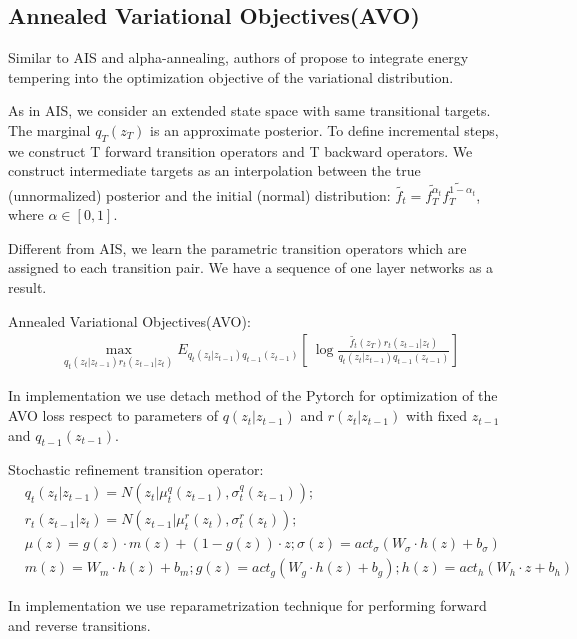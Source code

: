 \documentclass{article}
\begin{document}
\subsection*{Annealed Variational Objectives(AVO)}

Similar to AIS and alpha-annealing, authors of \cite{main_Huang2018ImprovingEI} propose to integrate energy tempering into the optimization objective of the variational distribution. 

As in AIS, we consider an extended state space with same transitional targets.
The marginal $q_T(z_T)$ is an approximate posterior. 
To define incremental steps, we construct T forward transition operators and T backward operators. 
We construct intermediate targets
as an interpolation between the true (unnormalized) posterior and the initial (normal) distribution:
$\tilde{f_t} = \tilde{f_T^{\alpha_t}}\tilde{f_T^{1 - \alpha_t}}$, where $\alpha \in [0, 1]$. 



Different from AIS, we learn the parametric transition operators which are assigned to each transition pair. We have a sequence of one layer networks as a result.

Annealed Variational Objectives(AVO):
\begin{align*}
    \max_{q_t(z_t| z_{t-1})r_{t}(z_{t-1} | z_t)} E_{q_t(z_t| z_{t-1})q_{t-1}(z_{t-1})}[\ 
    \log \frac{\tilde{f_t}(z_T) r_{t}(z_{t-1} | z_t)}{q_t(z_t| z_{t-1})q_{t-1}(z_{t-1})} ]
\end{align*}

In implementation we use detach method of the Pytorch for optimization of the AVO loss respect to parameters of $q(z_t|z_{t -1 })$ and $r(z_t|z_{t - 1})$ with fixed $z_{t - 1}$ and $q_{t - 1}(z_{t - 1})$.

Stochastic refinement transition operator:
\begin{align*}
    & q_t(z_t | z_{t - 1}) = N(z_t | \mu_t^q(z_{t - 1}), \sigma_t^q(z_{t - 1})); \\
    & r_t(z_{t - 1} | z_t) = N(z_{t - 1} | \mu_t^r(z_{t}), \sigma_t^r(z_{t})); \\
    & \mu(z) = g(z) \cdot m(z) + (1 - g(z)) \cdot z; \sigma(z) = act_{\sigma}(W_{\sigma}\cdot h(z) + b_{\sigma}) \\
    & m(z) = W_{m}\cdot h(z) + b_{m}; g(z) = act_{g}(W_{g}\cdot h(z) + b_{g}); h(z) = act_{h}(W_{h}\cdot z + b_{h})
\end{align*}

In implementation we use reparametrization technique for performing forward and reverse transitions.
\end{document}
